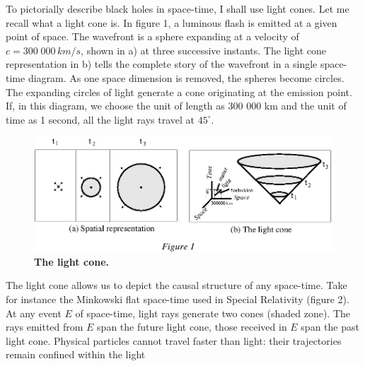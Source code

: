 \documentclass{lamuphys}
\begin{document}
To pictorially describe black holes in space-time, I shall use light cones.
Let me recall what a light cone is.
In figure 1, a luminous flash is emitted at a given point of
space. The wavefront is a sphere expanding at a velocity of 
$c = 300\;000 \, km/s$,
shown in a) at three successive instants. The light cone
representation in b) tells the complete story of the wavefront in a single
space-time diagram. As one space dimension is removed, the spheres become
circles. The expanding circles of light generate a cone originating at the
emission point. If, in this diagram, we choose the unit of length as 300 000 km
and the unit of time as 1 second, all the light rays
travel at $45^{\circ}$.

\begin{figure}[htb]
  \begin{center}
    \leavevmode
    \includegraphics{lightcone.ps}
    \caption{\textbf{The light cone.}}
  \end{center}
\end{figure}
The light cone allows us to depict the causal structure of any space-time. Take
for instance the Minkowski flat space-time used in Special
Relativity (figure 2). At any event $E$ of space-time, light rays generate two
cones (shaded zone). The rays emitted from $E$ span the future light cone, those
received in $E$ span the past light cone.  Physical particles cannot travel
faster than light: their trajectories remain confined within the light
\end{document}
